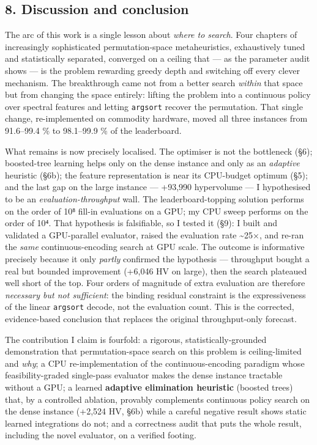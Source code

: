 \documentclass[
  11pt,
]{article}
\begin{document}
\hypertarget{discussion-and-conclusion}{%
\subsection{8. Discussion and
conclusion}\label{discussion-and-conclusion}}

The arc of this work is a single lesson about \emph{where to search}.
Four chapters of increasingly sophisticated permutation-space
metaheuristics, exhaustively tuned and statistically separated,
converged on a ceiling that --- as the parameter audit shows --- is the
problem rewarding greedy depth and switching off every clever mechanism.
The breakthrough came not from a better search \emph{within} that space
but from changing the space entirely: lifting the problem into a
continuous policy over spectral features and letting \texttt{argsort}
recover the permutation. That single change, re-implemented on commodity
hardware, moved all three instances from 91.6--99.4 \% to 98.1--99.9 \%
of the leaderboard.

What remains is now precisely localised. The optimiser is not the
bottleneck (§6); boosted-tree learning helps only on the dense instance
and only as an \emph{adaptive} heuristic (§6b); the feature
representation is near its CPU-budget optimum (§5); and the last gap on
the large instance --- +93,990 hypervolume --- I hypothesised to be an
\emph{evaluation-throughput} wall. The leaderboard-topping solution
performs on the order of 10⁸ fill-in evaluations on a GPU; my CPU sweep
performs on the order of 10⁴. That hypothesis is falsifiable, so I
tested it (§9): I built and validated a GPU-parallel evaluator, raised
the evaluation rate \textasciitilde25×, and re-ran the \emph{same}
continuous-encoding search at GPU scale. The outcome is informative
precisely because it only \emph{partly} confirmed the hypothesis ---
throughput bought a real but bounded improvement (+6,046 HV on large),
then the search plateaued well short of the top. Four orders of
magnitude of extra evaluation are therefore \emph{necessary but not
sufficient}: the binding residual constraint is the expressiveness of
the linear \texttt{argsort} decode, not the evaluation count. This is
the corrected, evidence-based conclusion that replaces the original
throughput-only forecast.

The contribution I claim is fourfold: a rigorous, statistically-grounded
demonstration that permutation-space search on this problem is
ceiling-limited and \emph{why}; a CPU re-implementation of the
continuous-encoding paradigm whose feasibility-graded single-pass
evaluator makes the dense instance tractable without a GPU; a learned
\textbf{adaptive elimination heuristic} (boosted trees) that, by a
controlled ablation, provably complements continuous policy search on
the dense instance (+2,524 HV, §6b) while a careful negative result
shows static learned integrations do not; and a correctness audit that
puts the whole result, including the novel evaluator, on a verified
footing.
\end{document}
